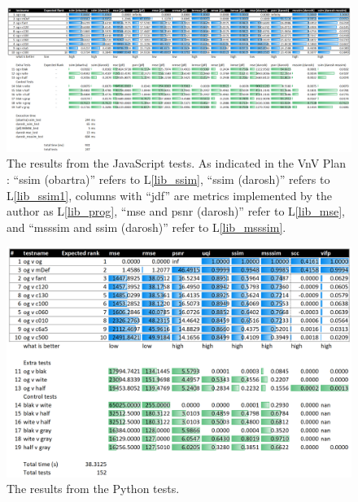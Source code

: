 \documentclass[12pt, titlepage]{article}
\newcommand{\lref}[1]{L\ref{#1}}
\begin{document}
\begin{landscape}
\vspace*{\fill}
\begin{figure}[h!]
  \begin{center}
  \includegraphics[width=22cm]{test-analysis/js-tests-results.png}
  \caption{The results from the JavaScript tests.
  As indicated in the VnV Plan \cite{VnV_plan}:
  ``ssim (obartra)'' refers to \lref{lib_ssim}, ``ssim (darosh)'' refers to \lref{lib_ssim1},
  columns with ``jdf'' are metrics implemented by the author as \lref{lib_prog},
  ``mse and psnr (darosh)'' refer to \lref{lib_mse}, and
  ``msssim and ssim (darosh)'' refer to \lref{lib_msssim}.}
  \label{fig_js_results}
  \end{center}
\end{figure}
\vspace*{\fill}
\end{landscape}

\begin{figure}[h!]
  \begin{center}
  \includegraphics[width=1.0\textwidth]{test-analysis/py-tests-results.png}
  \caption{The results from the Python tests.}
  \label{fig_py_results}
  \end{center}
\end{figure}
\end{document}
